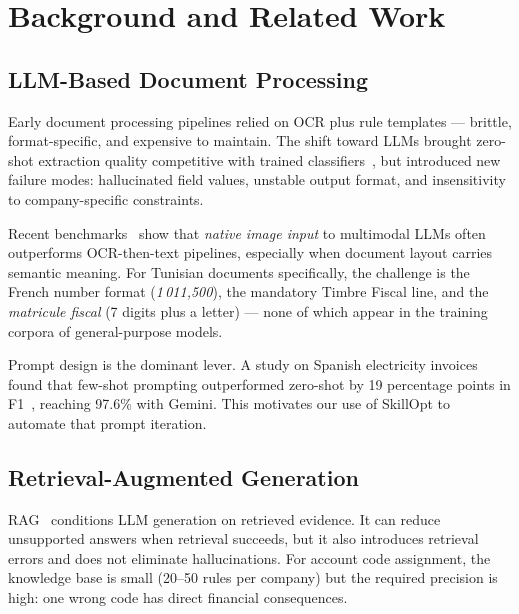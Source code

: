 \section{Background and Related Work}
\label{sec:background}

\subsection{LLM-Based Document Processing}

Early document processing pipelines relied on OCR plus rule templates — brittle,
format-specific, and expensive to maintain. The shift toward LLMs brought
zero-shot extraction quality competitive with trained classifiers~\cite{li2023structuredext},
but introduced new failure modes: hallucinated field values, unstable output format,
and insensitivity to company-specific constraints.

Recent benchmarks~\cite{invoicellm2024,ocrornot2025} show that \emph{native
image input} to multimodal LLMs often outperforms OCR-then-text pipelines,
especially when document layout carries semantic meaning. For Tunisian documents
specifically, the challenge is the French number format (\textit{1\,011,500}),
the mandatory Timbre Fiscal line, and the \textit{matricule fiscal} (7 digits plus
a letter) — none of which appear in the training corpora of general-purpose models.

Prompt design is the dominant lever. A study on Spanish electricity invoices found
that few-shot prompting outperformed zero-shot by 19 percentage points in
F1~\cite{electricityinvoice2025}, reaching 97.6\% with Gemini. This motivates our
use of SkillOpt to automate that prompt iteration.

\subsection{Retrieval-Augmented Generation}

RAG~\cite{lewis2020rag} conditions LLM generation on retrieved evidence. It can
reduce unsupported answers when retrieval succeeds, but it also introduces
retrieval errors and does not eliminate hallucinations. For account code assignment, the
knowledge base is small (20–50 rules per company) but the required precision is
high: one wrong code has direct financial consequences.

